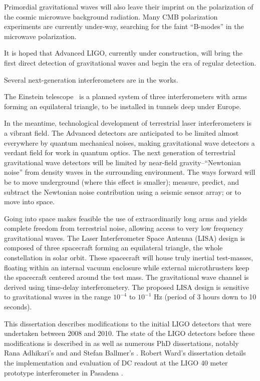 Primordial gravitational waves will also leave their imprint on the
polarization of the cosmic microwave background radiation.  Many CMB
polarization experiments are currently under-way, searching for the
faint ``B-modes'' in the microwave polarization.


It is hoped that Advanced LIGO, currently under construction, will
bring the first direct detection of gravitational waves and begin the
era of regular detection.

Several next-generation interferometers are in the works. 

The Einstein telescope~\cite{EinsteinTelescopeDesignStudy2011} is a
planned system of three interferometers with arms forming an
equilateral triangle, to be installed in tunnels deep under Europe.

In the meantime, technological development of terrestrial laser
interferometers is a vibrant field.  The Advanced detectors are
anticipated to be limited almost everywhere by quantum mechanical
noises, making gravitational wave detectors a verdant field for work
in quantum optics.  The next generation of terrestrial gravitational
wave detectors will be limited by near-field gravity--``Newtonian
noise'' from density waves in the surrounding environment.  The ways
forward will be to move underground (where this effect is smaller);
measure, predict, and subtract the Newtonian noise contribution using
a seismic sensor array; or to move into space.

Going into space makes feasible the use of extraordinarily long arms
and yields complete freedom from terrestrial noise, allowing access to
very low frequency gravitational waves.  The Laser Interferometer
Space Antenna (LISA) design is composed of three spacecraft forming an
equilateral triangle, the whole constellation in solar orbit.  These
spacecraft will house truly inertial test-masses, floating within an
internal vacuum enclosure while external microthrusters keep the
spacecraft centered around the test mass.  The gravitational wave
channel is derived using time-delay interferometery.  The proposed
LISA design is sensitive to gravitational waves in the range $10^{-4}$
to $10^{-1}$ Hz (period of 3 hours down to 10 seconds).



This dissertation describes modifications to the initial LIGO
detectors that were undertaken between 2008 and 2010.  The state of
the LIGO detectors before these modifications is described in
\cite{S5InstrumentPaper} as well as numerous PhD dissertations,
notably Rana Adhikari's \cite{RanaThesis} and and Stefan Ballmer's
\cite{Ballmer2006LIGO}.  Robert Ward's dissertation details the
implementation and evaluation of DC readout at the LIGO 40 meter
prototype interferometer in Pasadena \cite{RobWardThesis}.

